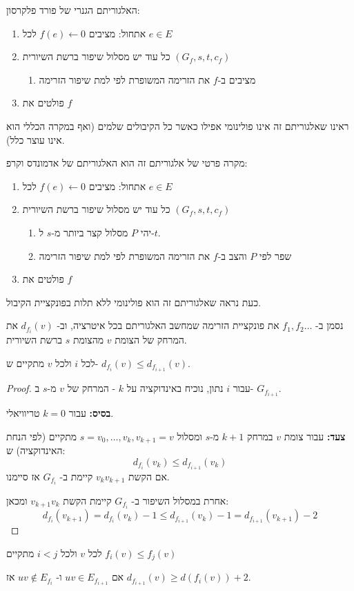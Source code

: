 האלגוריתם הגנרי של פורד פלקרסון:
\begin{enumerate}
\item
אתחול: מציבים 
$f(e) \leftarrow 0$
לכל
$e \in E$

\item
כל עוד יש מסלול שיפור ברשת השיורית
$(G_f, s, t, c_f)$
\begin{enumerate}
\item
מציבים ב-$f$ את הזרימה המשופרת לפי למת שיפור הזרימה
\end{enumerate}
\item
פולטים את $f$
\end{enumerate}

ראינו שאלגוריתם זה אינו פולינומי אפילו כאשר כל הקיבולים שלמים (ואף במקרה הכללי הוא אינו עוצר כלל).

מקרה פרטי של אלגוריתם זה הוא האלגוריתם של אדמונדס וקרפ:

\begin{enumerate}
\item
אתחול: מציבים 
$f(e) \leftarrow 0$
לכל
$e \in E$

\item
כל עוד יש מסלול שיפור ברשת השיורית
$(G_f, s, t, c_f)$
\begin{enumerate}
\item
יהי $P$ מסלול קצר ביותר מ-$s$ ל-$t$.
\item
שפר לפי $P$ והצב ב-$f$ את הזרימה המשופרת לפי למת שיפור הזרימה
\end{enumerate}
\item
פולטים את $f$
\end{enumerate}


כעת נראה שאלגוריתם זה הוא פולינומי ללא תלות בפונקציית הקיבול.

נסמן ב-%
$f_1, f_2 \ldots $
את פונקציית הזרימה שמחשב האלגוריתם בכל איטרציה, וב-%
$d_{f_i}(v)$
את המרחק של הצומת $v$ מהצומת $s$ ברשת השיורית.

\begin{claim}
לכל $i$ ולכל $v$ מתקיים ש-%
$d_{f_i}(v) \leq d_{f_{i+1}}(v)$.
\end{claim}

\begin{proof}
עבור $i$ נתון, נוכיח באינדוקציה על $k$ - המרחק של $v$ מ-$s$ ב-%
$G_{f_{i + 1}}$.

\textbf{בסיס:}
עבור 
$k=0$
טריוויאלי.

\textbf{צעד:}
עבור צומת $v$ במרחק 
$k + 1$ 
מ-$s$ ומסלול
$s = v_0, \ldots, v_k, v_{k + 1} = v$
מתקיים (לפי הנחת האינדוקציה) ש:
$$d_{f_i}(v_k) \leq d_{f_{i + 1}}(v_k)$$
אם הקשת 
$v_k v_{k + 1}$
קיימת ב-%
$G_{f_i}$
אז סיימנו.

אחרת במסלול השיפור ב-%
$G_{f_i}$
קיימת הקשת 
$v_{k+1}v_k$
ומכאן:
$$
d_{f_i}(v_{k + 1}) =
d_{f_i}(v_{k}) - 1 \leq 
d_{f_{i + 1}}(v_{k}) - 1 =
d_{f_{i + 1}}(v_{k + 1}) - 2
$$
\end{proof}

\begin{corollary}
לכל $v$ ולכל
$i < j$
מתקיים
$f_i(v) \leq f_j(v)$

\end{corollary}

\begin{corollary}
אם
$uv \in E_{f_{i + 1}}$
ו-%
$uv \notin E_{f_{i}}$
אז
$d_{f_{i + 1}}(v) \geq d(f_{i}(v)) + 2$.
\end{corollary}
